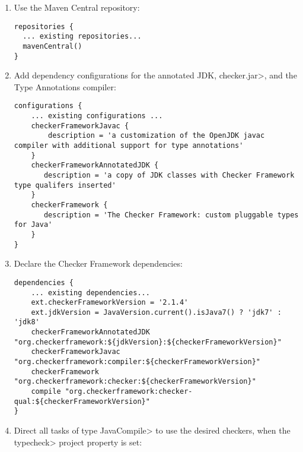 \begin{enumerate}

\item Use the Maven Central repository:

\begin{Verbatim}
repositories {
  ... existing repositories...
  mavenCentral()
}
\end{Verbatim}

\item Add dependency configurations for the annotated JDK, \<checker.jar>, and the Type Annotations compiler:

\begin{mysmall}
\begin{Verbatim}
configurations {
    ... existing configurations ...
    checkerFrameworkJavac {
        description = 'a customization of the OpenJDK javac compiler with additional support for type annotations'
    }
    checkerFrameworkAnnotatedJDK {
       description = 'a copy of JDK classes with Checker Framework type qualifers inserted'
    }
    checkerFramework {
       description = 'The Checker Framework: custom pluggable types for Java'
    }
}
\end{Verbatim}
\end{mysmall}

\item Declare the Checker Framework dependencies:

\begin{mysmall}
\begin{Verbatim}
dependencies {
    ... existing dependencies...
    ext.checkerFrameworkVersion = '2.1.4'
    ext.jdkVersion = JavaVersion.current().isJava7() ? 'jdk7' : 'jdk8'
    checkerFrameworkAnnotatedJDK "org.checkerframework:${jdkVersion}:${checkerFrameworkVersion}"
    checkerFrameworkJavac "org.checkerframework:compiler:${checkerFrameworkVersion}"
    checkerFramework "org.checkerframework:checker:${checkerFrameworkVersion}"
    compile "org.checkerframework:checker-qual:${checkerFrameworkVersion}"
}
\end{Verbatim}
\end{mysmall}

\item Direct all tasks of type \<JavaCompile> to use the desired checkers, when the \<typecheck> project property is set:


\end{enumerate}
